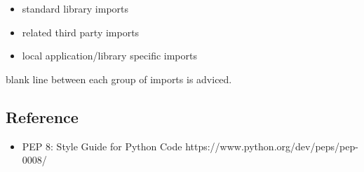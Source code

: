 \documentclass[11pt]{article}
\providecommand{\tightlist}{%
      \setlength{\itemsep}{0pt}\setlength{\parskip}{0pt}}
\begin{document}
\begin{itemize}
\tightlist
\item
  standard library imports
\item
  related third party imports
\item
  local application/library specific imports
\end{itemize}

blank line between each group of imports is adviced.

    \hypertarget{reference}{%
\subsection{Reference}\label{reference}}

\begin{itemize}
\tightlist
\item
  PEP 8: Style Guide for Python Code
  https://www.python.org/dev/peps/pep-0008/
\end{itemize}


    
    
    
    
\end{document}
